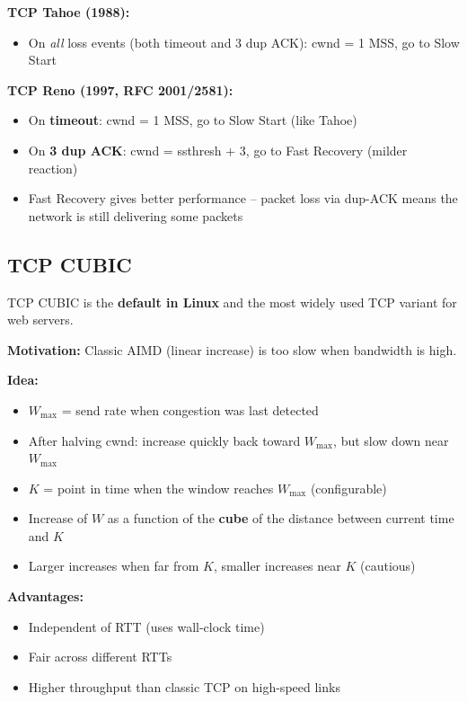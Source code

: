 \begin{keybox}
\textbf{TCP Tahoe (1988):}
\begin{itemize}[noitemsep]
    \item On \emph{all} loss events (both timeout and 3 dup ACK): cwnd = 1 MSS, go to Slow Start
\end{itemize}

\textbf{TCP Reno (1997, RFC 2001/2581):}
\begin{itemize}[noitemsep]
    \item On \textbf{timeout}: cwnd = 1 MSS, go to Slow Start (like Tahoe)
    \item On \textbf{3 dup ACK}: cwnd = ssthresh + 3, go to Fast Recovery (milder reaction)
    \item Fast Recovery gives better performance -- packet loss via dup-ACK means the network is still delivering some packets
\end{itemize}
\end{keybox}

\subsection{TCP CUBIC}

\begin{keybox}
TCP CUBIC is the \textbf{default in Linux} and the most widely used TCP variant for web servers.

\textbf{Motivation:} Classic AIMD (linear increase) is too slow when bandwidth is high.

\textbf{Idea:}
\begin{itemize}[noitemsep]
    \item $W_{\max}$ = send rate when congestion was last detected
    \item After halving cwnd: increase quickly back toward $W_{\max}$, but slow down near $W_{\max}$
    \item $K$ = point in time when the window reaches $W_{\max}$ (configurable)
    \item Increase of $W$ as a function of the \textbf{cube} of the distance between current time and $K$
    \item Larger increases when far from $K$, smaller increases near $K$ (cautious)
\end{itemize}

\textbf{Advantages:}
\begin{itemize}[noitemsep]
    \item Independent of RTT (uses wall-clock time)
    \item Fair across different RTTs
    \item Higher throughput than classic TCP on high-speed links
\end{itemize}
\end{keybox}

